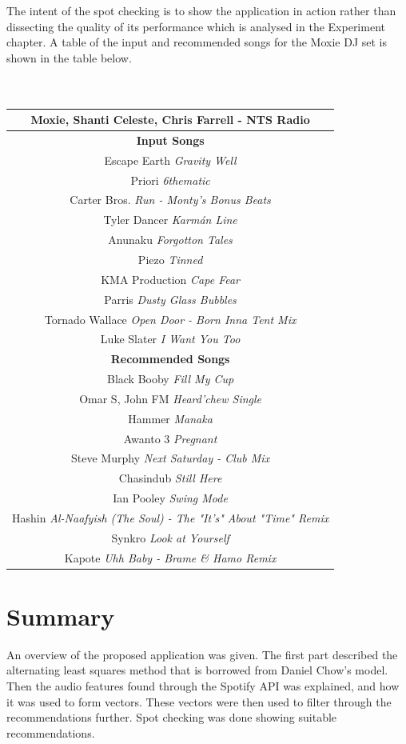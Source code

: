 The intent of the spot checking is to show the application in action rather than dissecting the quality of its performance which is analysed in the Experiment chapter. A table of the input and recommended songs for the Moxie DJ set is shown in the table below.
\\
\\
\\
\begin{center}
	\begin{tabular}{ |c|} 
		\hline
		\textbf{Moxie, Shanti Celeste, Chris Farrell - NTS Radio}\\ 
		\hline \textbf{Input Songs}\\ 
		\hline Escape Earth \textit{Gravity Well} \\ 
		\hline Priori \textit{6thematic }\\
		\hline Carter Bros. \textit{Run - Monty's Bonus Beats}\\
		\hline Tyler Dancer \textit{Karmán Line}\\ 
		\hline Anunaku \textit{Forgotton Tales}\\
		\hline Piezo \textit{Tinned}\\
		\hline KMA Production \textit{Cape Fear}\\
		\hline Parris \textit{Dusty Glass Bubbles}\\
		\hline Tornado Wallace \textit{Open Door - Born Inna Tent Mix}\\
		\hline Luke Slater \textit{I Want You Too}\\
		\hline \textbf{Recommended Songs}\\ 
		\hline Black Booby \textit{Fill My Cup}\\
		\hline Omar S, John FM \textit{Heard'chew Single}\\
		\hline Hammer \textit{Manaka}\\
		\hline Awanto 3 \textit{Pregnant}\\
		\hline Steve Murphy \textit{Next Saturday - Club Mix}\\
		\hline Chasindub \textit{Still Here}\\
		\hline Ian Pooley \textit{Swing Mode}\\
		\hline Hashin \textit{Al-Naafyish (The Soul) - The "It's" About "Time" Remix}\\
		\hline Synkro \textit{Look at Yourself}\\
		\hline Kapote \textit{Uhh Baby - Brame \& Hamo Remix}\\
		\hline
	\end{tabular}
\end{center}


\section{Summary}
An overview of the proposed application was given. The first part described the alternating least squares method that is borrowed from Daniel Chow's model. Then the audio features found through the Spotify API was explained, and how it was used to form vectors. These vectors were then used to filter through the recommendations further. Spot checking was done showing suitable recommendations.



